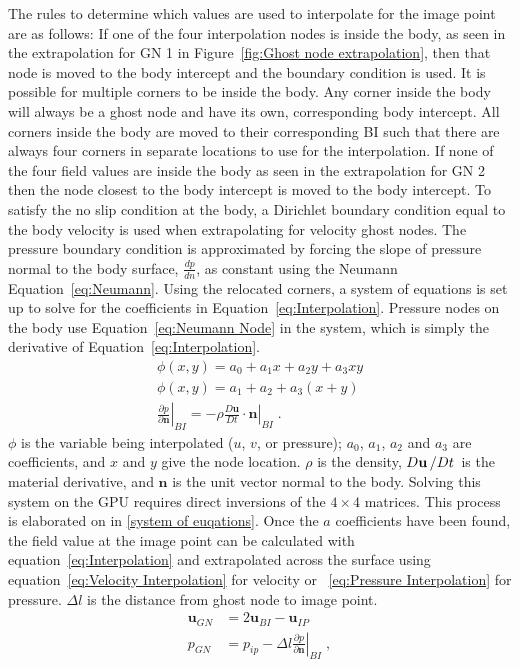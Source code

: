 \documentclass[onehalf,11pt]{beavtex}
\begin{document}
The rules to determine which values are used to interpolate for the image point are as follows:
If one of the four interpolation nodes is inside the body, as seen in the extrapolation for GN 1 in Figure~\ref{fig:Ghost node extrapolation}, then that node is moved to the body intercept and the boundary condition is used. 
It is possible for multiple corners to be inside the body. 
Any corner inside the body will always be a ghost node and have its own, corresponding body intercept. 
All corners inside the body are moved to their corresponding BI such that there are always four corners in separate locations to use for the interpolation. 
If none of the four field values are inside the body as seen in the extrapolation for GN 2 then the node closest to the body intercept is moved to the body intercept.
To satisfy the no slip condition at the body, a Dirichlet boundary condition equal to the body velocity is used when extrapolating for velocity ghost nodes. 
The pressure boundary condition is approximated by forcing the slope of pressure normal to the body surface, $\frac{dp}{dn}$, as constant using the Neumann Equation~\eqref{eq:Neumann}. 
Using the relocated corners, a system of equations is set up to solve for the coefficients in Equation~\eqref{eq:Interpolation}.
Pressure nodes on the body use Equation~\eqref{eq:Neumann Node} in the system, which is simply the derivative of Equation~\eqref{eq:Interpolation}. 
\begin{align}
\phi (x,y) = a_0 + a_1 x + a_2y + a_3 x y \label{eq:Interpolation} \\
\phi (x,y) = a_1 + a_2 + a_3 (x+y) \label{eq:Neumann Node} \\
\left. \frac{\partial p}{\partial \textbf{n}}\right|_{BI} = \left. -\rho \frac{D\textbf{u}}{Dt}\cdot \textbf{n}\right|_{BI}
\label{eq:Neumann}\;.
\end{align}
$\phi$ is the variable being interpolated ($u$, $v$, or pressure); $a_0$, $a_1$, $a_2$ and $a_3$ are coefficients, and $x$ and $y$ give the node location.
$\rho$ is the density, $D\textbf{u}\left/Dt\right.$ is the material derivative, and $\textbf{n}$ is the unit vector normal to the body.
Solving this system on the GPU requires direct inversions of the $4 \times 4$ matrices.
This process is elaborated on in \ref{system of euqations}. 
Once the $a$ coefficients have been found, the field value at the image point can be calculated with equation~\eqref{eq:Interpolation} and extrapolated across the surface using equation~\eqref{eq:Velocity Interpolation} for velocity or ~\eqref{eq:Pressure Interpolation} for pressure. 
$\Delta l$ is the distance from ghost node to image point.
\begin{align}
\textbf{u}_{GN} &= 2\textbf{u}_{BI} - \textbf{u}_{IP} \label{eq:Velocity Interpolation} \\
p_{GN} &= p_{ip} - \Delta l \left. \frac{\partial p}{\partial \textbf{n}}\right|_{BI} \;, \label{eq:Pressure Interpolation}
\end{align}
\end{document}
